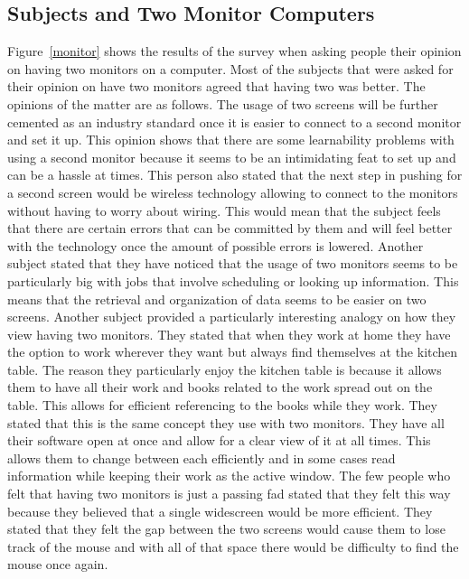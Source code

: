 \documentclass[11pt]{article}
\begin{document}
\subsection{Subjects and Two Monitor Computers}
Figure~\ref{monitor} shows the results of the survey when asking people their opinion on having two monitors on a computer. Most of the subjects that were asked for their opinion on have two monitors agreed that having two was better. The opinions of the matter are as follows. The usage of two screens will be further cemented as an industry standard once it is easier to connect to a second monitor and set it up. This opinion shows that there are some learnability problems with using a second monitor because it seems to be an intimidating feat to set up and can be a hassle at times. This person also stated that the next step in pushing for a second screen would be wireless technology allowing to connect to the monitors without having to worry about wiring. This would mean that the subject feels that there are certain errors that can be committed by them and will feel better with the technology once the amount of possible errors is lowered. Another subject stated that they have noticed that the usage of two monitors seems to be particularly big with jobs that involve scheduling or looking up information. This means that the retrieval and organization of data seems to be easier on two screens. Another subject provided a particularly interesting analogy on how they view having two monitors. They stated that when they work at home they have the option to work wherever they want but always find themselves at the kitchen table. The reason they particularly enjoy the kitchen table is because it allows them to have all their work and books related to the work spread out on the table. This allows for efficient referencing to the books while they work. They stated that this is the same concept they use with two monitors. They have all their software open at once and allow for a clear view of it at all times. This allows them to change between each efficiently and in some cases read information while keeping their work as the active window. The few people who felt that having two monitors is just a passing fad stated that they felt this way because they believed that a single widescreen would be more efficient. They stated that they felt the gap between the two screens would cause them to lose track of the mouse and with all of that space there would be difficulty to find the mouse once again.
\end{document}
